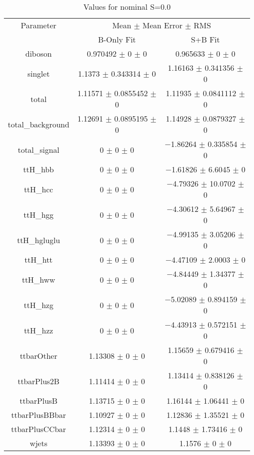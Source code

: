 \begin{table}
\centering
\caption{Values for nominal S=0.0}
\begin{tabular}{ccc}
\toprule
Parameter & \multicolumn{2}{c}{Mean $\pm$ Mean Error $\pm$ RMS}\\
 & B-Only Fit & S+B Fit\\
\midrule
diboson & \num{0.970492} $\pm$ \num{0} $\pm$ \num{0} & \num{0.965633} $\pm$ \num{0} $\pm$ \num{0}\\
singlet & \num{1.1373} $\pm$ \num{0.343314} $\pm$ \num{0} & \num{1.16163} $\pm$ \num{0.341356} $\pm$ \num{0}\\
total & \num{1.11571} $\pm$ \num{0.0855452} $\pm$ \num{0} & \num{1.11935} $\pm$ \num{0.0841112} $\pm$ \num{0}\\
total\_background & \num{1.12691} $\pm$ \num{0.0895195} $\pm$ \num{0} & \num{1.14928} $\pm$ \num{0.0879327} $\pm$ \num{0}\\
total\_signal & \num{0} $\pm$ \num{0} $\pm$ \num{0} & \num{-1.86264} $\pm$ \num{0.335854} $\pm$ \num{0}\\
ttH\_hbb & \num{0} $\pm$ \num{0} $\pm$ \num{0} & \num{-1.61826} $\pm$ \num{6.6045} $\pm$ \num{0}\\
ttH\_hcc & \num{0} $\pm$ \num{0} $\pm$ \num{0} & \num{-4.79326} $\pm$ \num{10.0702} $\pm$ \num{0}\\
ttH\_hgg & \num{0} $\pm$ \num{0} $\pm$ \num{0} & \num{-4.30612} $\pm$ \num{5.64967} $\pm$ \num{0}\\
ttH\_hgluglu & \num{0} $\pm$ \num{0} $\pm$ \num{0} & \num{-4.99135} $\pm$ \num{3.05206} $\pm$ \num{0}\\
ttH\_htt & \num{0} $\pm$ \num{0} $\pm$ \num{0} & \num{-4.47109} $\pm$ \num{2.0003} $\pm$ \num{0}\\
ttH\_hww & \num{0} $\pm$ \num{0} $\pm$ \num{0} & \num{-4.84449} $\pm$ \num{1.34377} $\pm$ \num{0}\\
ttH\_hzg & \num{0} $\pm$ \num{0} $\pm$ \num{0} & \num{-5.02089} $\pm$ \num{0.894159} $\pm$ \num{0}\\
ttH\_hzz & \num{0} $\pm$ \num{0} $\pm$ \num{0} & \num{-4.43913} $\pm$ \num{0.572151} $\pm$ \num{0}\\
ttbarOther & \num{1.13308} $\pm$ \num{0} $\pm$ \num{0} & \num{1.15659} $\pm$ \num{0.679416} $\pm$ \num{0}\\
ttbarPlus2B & \num{1.11414} $\pm$ \num{0} $\pm$ \num{0} & \num{1.13414} $\pm$ \num{0.838126} $\pm$ \num{0}\\
ttbarPlusB & \num{1.13715} $\pm$ \num{0} $\pm$ \num{0} & \num{1.16144} $\pm$ \num{1.06441} $\pm$ \num{0}\\
ttbarPlusBBbar & \num{1.10927} $\pm$ \num{0} $\pm$ \num{0} & \num{1.12836} $\pm$ \num{1.35521} $\pm$ \num{0}\\
ttbarPlusCCbar & \num{1.12314} $\pm$ \num{0} $\pm$ \num{0} & \num{1.1448} $\pm$ \num{1.73416} $\pm$ \num{0}\\
wjets & \num{1.13393} $\pm$ \num{0} $\pm$ \num{0} & \num{1.1576} $\pm$ \num{0} $\pm$ \num{0}\\
\bottomrule
\end{tabular}
\end{table}